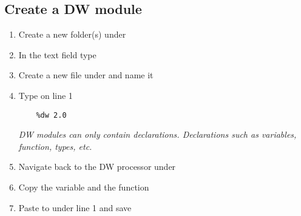 \subsection{Create a DW module}
\begin{enumerate}
\item Create a new folder(s) under 
\item In the text field type 
\item Create a new file under  and name it 
\item Type on line 1
  \begin{verbatim}
    %dw 2.0
  \end{verbatim}
  \emph{
    DW modules can only contain declarations.  Declarations such as variables, function, types, etc.
  }
\item Navigate back to the DW processor under 
\item Copy the  variable and the  function
\item Paste to  under line 1 and save
\end{enumerate}

